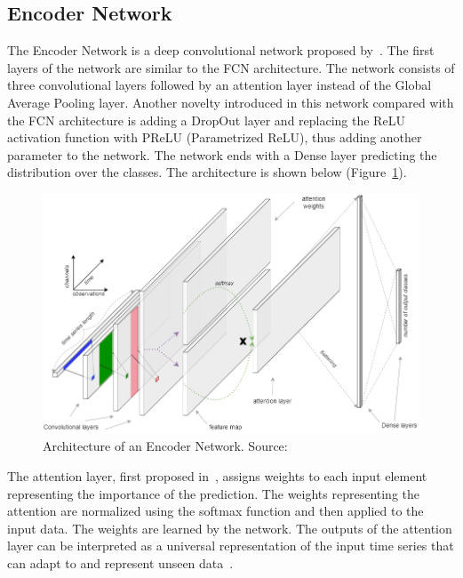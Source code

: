 \documentclass[a4paper,11pt,twoside]{report}
\theoremstyle{definition}
\begin{document}
\FloatBarrier

\subsection{Encoder Network}
 The Encoder Network is a deep convolutional network proposed by~\cite{encoder}. The first layers of the network are similar to the FCN architecture. The network consists of three convolutional layers followed by an attention layer instead of the Global Average Pooling layer. Another novelty introduced in this network compared with the FCN architecture is adding a DropOut layer and replacing the ReLU activation function with PReLU (Parametrized ReLU), thus adding another parameter to the network. The network ends with a Dense layer predicting the distribution over the classes. The architecture is shown below (Figure~\ref{fig:encoder_img}).

\FloatBarrier

\begin{figure}[h!]
\centering
\includegraphics[width=15.5cm]{imgs/encoder.png}
\caption{Architecture of an Encoder Network. Source:~\cite{dl_tsc}}
\label{fig:encoder_img}
\end{figure}

\FloatBarrier

The attention layer, first proposed in~\cite{attention}, assigns weights to each input element representing the importance of the prediction. The weights representing the attention are normalized using the softmax function and then applied to the input data. The weights  are learned by the network. The outputs of the attention layer can be interpreted as a universal representation of the input time series that can adapt to and represent unseen data~\cite{encoder}.
\end{document}
